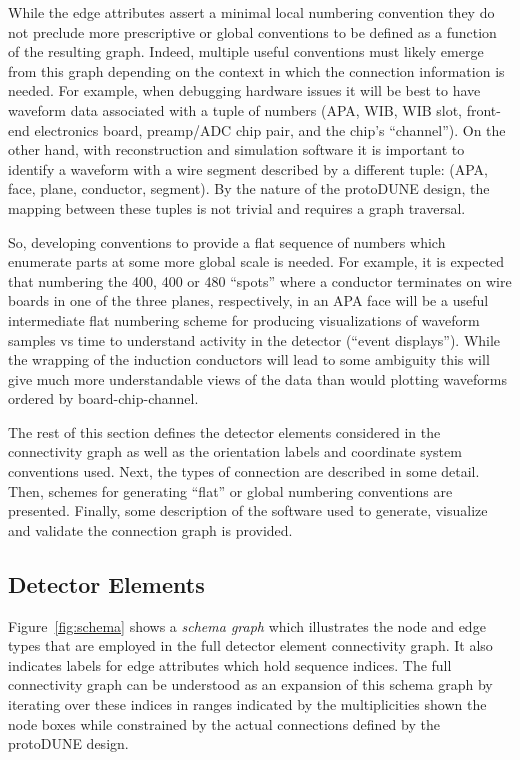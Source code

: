 \documentclass[pdftex,12pt,letter]{article}
\begin{document}
While the edge attributes assert a minimal local numbering convention
they do not preclude more prescriptive or global conventions to be
defined as a function of the resulting graph.  Indeed, multiple useful
conventions must likely emerge from this graph depending on the
context in which the connection information is needed.  For example,
when debugging hardware issues it will be best to have waveform data
associated with a tuple of numbers (APA, WIB, WIB slot, front-end
electronics board, preamp/ADC chip pair, and the chip's ``channel'').
On the other hand, with reconstruction and simulation software it is
important to identify a waveform with a wire segment described by a
different tuple: (APA, face, plane, conductor, segment).  By the
nature of the protoDUNE design, the mapping between these tuples is
not trivial and requires a graph traversal.

So, developing conventions to provide a flat sequence of numbers which
enumerate parts at some more global scale is needed.  For example, it
is expected that numbering the 400, 400 or 480 ``spots'' where a
conductor terminates on wire boards in one of the three planes,
respectively, in an APA face will be a useful intermediate flat
numbering scheme for producing visualizations of waveform samples vs
time to understand activity in the detector (``event displays'').
While the wrapping of the induction conductors will lead to some
ambiguity this will give much more understandable views of the data
than would plotting waveforms ordered by board-chip-channel.

The rest of this section defines the detector elements considered in
the connectivity graph as well as the orientation labels and
coordinate system conventions used.  Next, the types of connection are
described in some detail.  Then, schemes for generating ``flat'' or
global numbering conventions are presented.  Finally, some description
of the software used to generate, visualize and validate the
connection graph is provided.


\subsection{Detector Elements}
\label{sec:parts}

Figure~\ref{fig:schema} shows a \textit{schema graph} which
illustrates the node and edge types that are employed in the full
detector element connectivity graph.  It also indicates labels for
edge attributes which hold sequence indices.  The full connectivity
graph can be understood as an expansion of this schema graph by
iterating over these indices in ranges indicated by the multiplicities
shown the node boxes while constrained by the actual connections
defined by the protoDUNE design.
\end{document}
